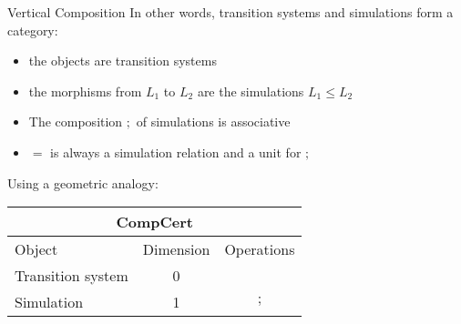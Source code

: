 \documentclass[aspectratio=1610,12pt]{beamer}
\begin{document}
\begin{frame}{Vertical Composition \fbox{$;$}} %
  In other words, transition systems and simulations form a category:
  \begin{itemize}
    \item the objects are transition systems
    \item the morphisms from $L_1$ to $L_2$ are the simulations $L_1 \le L_2$
    \item The composition $;$ of simulations is associative
    \item $=$ is always a simulation relation and a unit for $;$
  \end{itemize}

  \pause
  Using a geometric analogy:
  \begin{center}
    \begin{tabular}{lcc}
      \toprule
      \multicolumn{3}{c}{\textbf{CompCert}} \\
      \midrule
      Object & Dimension & Operations \\
      \midrule
      Transition system & 0 \\
      Simulation & 1 & $\mathbin;$ \\
      \bottomrule
    \end{tabular}
  \end{center}
\end{frame}
\end{document}
